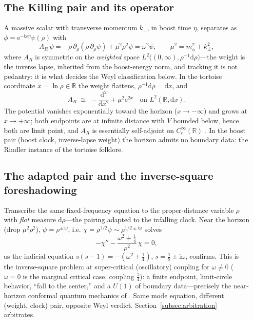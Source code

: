 \documentclass[11pt]{article}
\theoremstyle{definition}
\theoremstyle{remark}
\newcommand{\ii}{\mathrm{i}}
\newcommand{\ee}{\mathrm{e}}
\newcommand{\dd}{\mathrm{d}}
\begin{document}
\subsection{The Killing pair and its operator}

A massive scalar with transverse momentum $k_{\perp}$, in boost time
$\eta$, separates as $\phi=\ee^{-\ii\omega\eta}\psi(\rho)$ with
\begin{equation}
A_{R}\,\psi=-\rho\,\partial_{\rho}(\rho\,\partial_{\rho}\psi)
+\mu^{2}\rho^{2}\psi=\omega^{2}\psi,
\qquad \mu^{2}=m_{\phi}^{2}+k_{\perp}^{2},
\end{equation}
where $A_{R}$ is symmetric on the \emph{weighted} space
$L^{2}\bigl((0,\infty),\rho^{-1}\dd\rho\bigr)$---the weight is the
inverse lapse, inherited from the boost-energy norm, and tracking it
is not pedantry: it is what decides the Weyl classification below. In
the tortoise coordinate $x=\ln\rho\in\mathbb{R}$ the weight
flattens, $\rho^{-1}\dd\rho=\dd x$, and
\begin{equation}
A_{R}\;\cong\;-\frac{\dd^{2}}{\dd x^{2}}+\mu^{2}\ee^{2x}
\quad\text{on } L^{2}(\mathbb{R},\dd x).
\label{eq:rindlerop}
\end{equation}
The potential vanishes exponentially toward the horizon
($x\to-\infty$) and grows at $x\to+\infty$; both endpoints are at
infinite distance with $V$ bounded below, hence both are limit point,
and $A_{R}$ is essentially self-adjoint on
$C_{c}^{\infty}(\mathbb{R})$ \cite[Thm.~X.8]{ReedSimon2}. In the
boost pair (boost clock, inverse-lapse weight) the horizon admits no
boundary data: the Rindler instance of the tortoise folklore.

\subsection{The adapted pair and the inverse-square foreshadowing}
\label{subsec:rindlercqm}

Transcribe the same fixed-frequency equation to the proper-distance
variable $\rho$ with \emph{flat} measure $\dd\rho$---the pairing
adapted to the infalling clock. Near the horizon
(drop $\mu^{2}\rho^{2}$), $\psi=\rho^{\pm\ii\omega}$, i.e.
$\chi=\rho^{1/2}\psi\sim\rho^{1/2\pm\ii\omega}$ solves
\begin{equation}
-\chi''-\frac{\omega^{2}+\tfrac14}{\rho^{2}}\,\chi=0 ,
\end{equation}
as the indicial equation $s(s-1)=-(\omega^{2}+\frac14)$,
$s=\frac12\pm\ii\omega$, confirms. This is the inverse-square problem
at super-critical (oscillatory) coupling for $\omega\neq0$ ($\omega=0$
is the marginal critical case, coupling $\tfrac14$): a finite endpoint,
limit-circle behavior, ``fall to the center,'' and a $U(1)$ of
boundary data---precisely the near-horizon conformal quantum mechanics
of \cite{GuptaSen2002,CamblongOrdonez2005,CamblongOrdonez2007}. Same
mode equation, different (weight, clock) pair, opposite Weyl verdict.
Section~\ref{subsec:arbitration} arbitrates.
\end{document}
